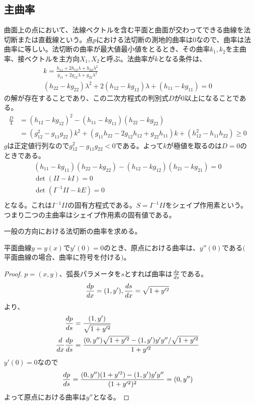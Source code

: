     \subsection{主曲率}
        曲面上の点において、法線ベクトルを含む平面と曲面が交わってできる曲線を法切断または直截線という。点$p$における法切断の測地的曲率は0なので、曲率は法曲率に等しい。法切断の曲率が最大値最小値をとるとき、その曲率$k_1,k_2$を主曲率、接ベクトルを主方向$X_1,X_2$と呼ぶ。法曲率が$k$となる条件は、
        \begin{gather*}
            k = \frac{h_{11} + 2h_{12}\lambda + h_{22}\lambda^2}{g_{11} + 2g_{12}\lambda + g_{22}\lambda^2}\\
            (h_{22} - kg_{22})\lambda^2 + 2(h_{12} - kg_{12})\lambda + (h_{11} - kg_{11}) = 0
        \end{gather*}
        の解が存在することであり、この二次方程式の判別式$D$が0以上になることである。
        \begin{align*}
            \frac{D}{4} &= (h_{12} - kg_{12})^2 - (h_{11} - kg_{11})(h_{22} - kg_{22})\\
            &= (g_{12}^2 - g_{11}g_{22})k^2 + (g_{11}h_{22} - 2g_{12}h_{12} + g_{22}h_{11})k + (h_{12}^2 - h_{11}h_{22}) \geq 0
        \end{align*}
        $g$は正定値行列なので$g_{12}^2 - g_{11}g_{22} < 0$である。よって$k$が極値を取るのは$D = 0$のときである。
        \begin{align*}
            (h_{11} - kg_{11})(h_{22} - kg_{22}) - (h_{12} - kg_{12})(h_{21} - kg_{21}) = 0\\
            \det(II - kI) = 0\\
            \det(I^{-1}II - kE) = 0\\
        \end{align*}
        となる。これは$I^{-1}II$の固有方程式である。$S = I^{-1}II$をシェイプ作用素という。つまり二つの主曲率はシェイプ作用素の固有値である。

        一般の方向における法切断の曲率を求める。
        \begin{lem}
            平面曲線$y = y(x)$で$y'(0) = 0$のとき、原点における曲率は、$y''(0)$である$($平面曲線の場合、曲率に符号を付ける$)$。
        \end{lem}
        \begin{proof}
            $p = (x,y)$、弧長パラメータを$s$とすれば曲率は$\de[p]{s}$である。
                \[\de[p]{x} = (1,y'), \de[s]{x} = \sqrt{1 + y'^2}\]
            より、
            \begin{align*}
                \de[p]{s} &= \frac{(1, y')}{\sqrt{1 + y'^2}}\\
                \de{x}\de[p]{s} &= \frac{(0, y'')\sqrt{1 + y'^2} - (1, y')y'y''/\sqrt{1 + y'^2}}{1 + y'^2}\\
            \end{align*}
            $y'(0) = 0$なので
                \[\de[p]{s} = \frac{(0, y'')(1 + y'^2) - (1, y')y'y''}{(1 + y'^2)^2} = (0,y'')\]
            よって原点における曲率は$y''$となる。
        \end{proof}

